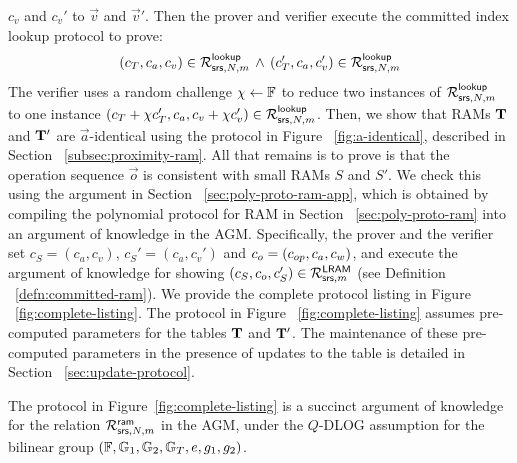 $c_v$ and $c_v'$ to $\vec{v}$ and $\vec{v}'$. Then the prover and verifier execute the committed index lookup protocol to
prove:
\begin{equation}
(c_T, c_a, c_v)\in \mathcal{R}^{\mathsf{lookup}}_{\mathsf{srs},N,m}\, \wedge\, (c_T', c_a, c_v')\in \mathcal{R}^{\mathsf{lookup}}_{\mathsf{srs},N,m}
\end{equation}
The verifier uses a random challenge $\chi\gets \mathbb{F}$ to reduce two instances of $\mathcal{R}^{\mathsf{lookup}}_{\mathsf{srs},N,m}$ to one instance
$(c_T + \chi c_T', c_a, c_v + \chi c_v')\in \mathcal{R}^{\mathsf{lookup}}_{\mathsf{srs},N,m}$. Then, we show that
RAMs $\mathbf{T}$ and $\mathbf{T}'$ are $\vec{a}$-identical using the protocol in Figure ~\ref{fig:a-identical}, described
in Section ~\ref{subsec:proximity-ram}.
All that remains is to prove is that the operation sequence $\vec{o}$ is consistent with small RAMs $S$ and $S'$.
We check this using the argument in Section ~\ref{sec:poly-proto-ram-app}, which is obtained by compiling the
polynomial protocol for RAM in Section ~\ref{sec:poly-proto-ram} into an argument of knowledge in the AGM.
Specifically, the prover and the verifier set
$c_S = (c_a, c_v)$, $c_S'=(c_a, c_v')$ and $c_o = (c_{op}, c_a, c_w)$, and execute the argument of knowledge for
showing $(c_S, c_o, c_S')\in \mathcal{R}^{\mathsf{LRAM}}_{\mathsf{srs},m}$ (see Definition ~\ref{defn:committed-ram}). We provide the complete protocol
listing in Figure ~\ref{fig:complete-listing}. The protocol in Figure ~\ref{fig:complete-listing} assumes pre-computed parameters
for the tables $\mathbf{T}$ and $\mathbf{T}'$. The maintenance of these pre-computed parameters in the presence of updates to the table
is detailed in Section ~\ref{sec:update-protocol}.

\begin{theorem}\label{thm:committed-ram}
The protocol in Figure~\ref{fig:complete-listing} is a succinct argument of knowledge for the relation $\mathcal{R}^{\mathsf{ram}}_{\mathsf{srs},N,m}$ in
the AGM, under the $Q$-DLOG assumption for the bilinear group $(\mathbb{F},\mathbb{G}_1,\mathbb{G}_2,\mathbb{G}_T,e,g_1,g_2)$.
\end{theorem}

